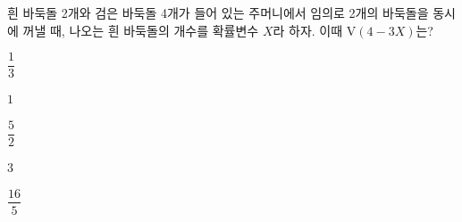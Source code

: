 흰 바둑돌 2개와 검은 바둑돌 4개가 들어 있는 주머니에서 임의로 2개의 바둑돌을 동시에 꺼낼 때, 나오는 흰 바둑돌의 개수를 확률변수 $X$라 하자. 이때 $\mathrm{V}(4-3X)$는?
\begin{choices32}{\rule[-3ex]{0pt}{8ex}$\dfrac{1}{3}$}{\rule[-3ex]{0pt}{8ex}$1$}{\rule[-3ex]{0pt}{8ex}$\dfrac{5}{2}$}{\rule[-3ex]{0pt}{8ex}$3$}{\rule[-3ex]{0pt}{8ex}$\dfrac{16}{5}$}\end{choices32}

